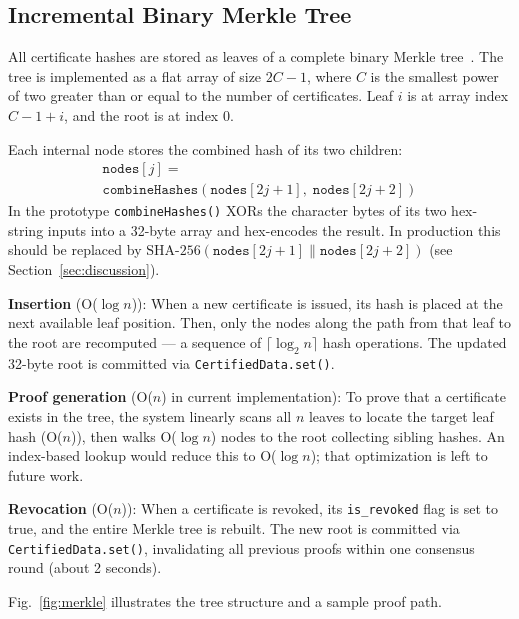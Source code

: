 \documentclass[journal]{IEEEtran}
\begin{document}
\subsection{Incremental Binary Merkle Tree}

All certificate hashes are stored as leaves of a complete binary Merkle tree~\cite{merkle1989certified}. The tree is implemented as a flat array of size $2C - 1$, where $C$ is the smallest power of two greater than or equal to the number of certificates. Leaf $i$ is at array index $C - 1 + i$, and the root is at index 0.

Each internal node stores the combined hash of its two children:
\begin{multline}
  \texttt{nodes}[j] = \\
    \texttt{combineHashes}(\texttt{nodes}[2j{+}1],\; \texttt{nodes}[2j{+}2])
  \label{eq:merkle}
\end{multline}
In the prototype \texttt{combineHashes()} XORs the character bytes of its two hex-string inputs into a 32-byte array and hex-encodes the result. In production this should be replaced by $\text{SHA-256}(\texttt{nodes}[2j+1] \| \texttt{nodes}[2j+2])$ (see Section~\ref{sec:discussion}).

\textbf{Insertion} (O($\log n$)): When a new certificate is issued, its hash is placed at the next available leaf position. Then, only the nodes along the path from that leaf to the root are recomputed — a sequence of $\lceil\log_2 n\rceil$ hash operations. The updated 32-byte root is committed via \texttt{CertifiedData.set()}.

\textbf{Proof generation} (O($n$) in current implementation): To prove that a certificate exists in the tree, the system linearly scans all $n$ leaves to locate the target leaf hash (O($n$)), then walks O($\log n$) nodes to the root collecting sibling hashes. An index-based lookup would reduce this to O($\log n$); that optimization is left to future work.

\textbf{Revocation} (O($n$)): When a certificate is revoked, its \texttt{is\_revoked} flag is set to true, and the entire Merkle tree is rebuilt. The new root is committed via \texttt{CertifiedData.set()}, invalidating all previous proofs within one consensus round (about 2 seconds).

Fig.~\ref{fig:merkle} illustrates the tree structure and a sample proof path.
\end{document}
